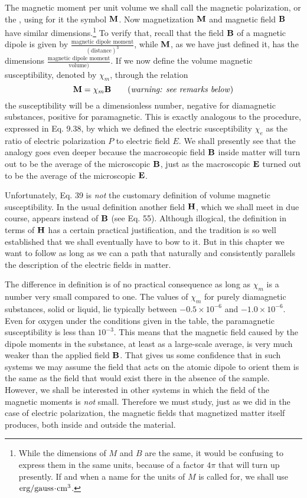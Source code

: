 The magnetic moment per unit volume we shall call the magnetic
polarization, or the , using for it the symbol $\mathbf{M}$. Now
magnetization $\mathbf{M}$ and magnetic field $\mathbf{B}$ have 
similar dimensions.\footnote{While the dimensions of $M$ and $B$
are the same, it would be confusing to express
them in the same units, because of a factor $4\pi$ that will turn up presently. If and
when a name for the units of $M$ is called for, we shall use 
$\textup{erg}/\textup{gauss}\!\cdot\!\textup{cm}^3$.} To
verify that, recall that the field $\mathbf{B}$ of a magnetic dipole is given by
$\frac{\text{magnetic dipole moment}}{(\text{distance})^3}$, while $\mathbf{M}$, as we have
just defined it, has the dimensions
$\frac{\text{magnetic dipole moment}}{\text{volume})}$. If we now define the
volume magnetic susceptibility, denoted by $\chi_m$, through the relation
\begin{equation}
  \mathbf{M} = \chi_m\mathbf{B} \qquad (\text{\emph{warning: see remarks below}})
\end{equation}
the susceptibility will be a dimensionless number, negative for 
diamagnetic substances, positive for paramagnetic. This is exactly
analogous to the procedure, expressed in Eq. 9.38, by which we
defined the electric susceptibility $\chi_e$ as the ratio of electric polarization
$P$ to electric field $E$. We shall presently see that the analogy goes
even deeper because the macroscopic field $\mathbf{B}$ inside matter will turn
out to be the average of the microscopic $\mathbf{B}$, just as the macroscopic $\mathbf{E}$
turned out to be the average of the microscopic $\mathbf{E}$.


Unfortunately, Eq. 39 is \emph{not} the customary definition of volume
magnetic susceptibility. In the usual definition another field $\mathbf{H}$,
which we shall meet in due course, appears instead of $\mathbf{B}$ (see Eq. 55).
Although illogical, the definition in terms of $\mathbf{H}$ has a certain practical
justification, and the tradition is so well established that we shall
eventually have to bow to it. But in this chapter we want to follow
as long as we can a path that naturally and consistently parallels the
description of the electric fields in matter.

The difference in definition is of no practical consequence as long
as $\chi_m$ is a number very small compared to one. The values of $\chi_m$
for purely diamagnetic substances, solid or liquid, lie typically between
$-0.5\times10^{-6}$ and $-1.0\times10^{-6}$. Even for oxygen under the
conditions given in the table, the paramagnetic susceptibility is less
than $10^{-3}$. This means that the magnetic field caused by the dipole
moments in the substance, at least as a large-scale average, is very
much weaker than the applied field $\mathbf{B}$. That gives us some confidence
that in such systems we may assume the field that acts on the
atomic dipole to orient them is the same as the field that would exist
there in the absence of the sample. However, we shall be interested
in other systems in which the field of the magnetic moments is \emph{not}
small. Therefore we must study, just as we did in the case of electric
polarization, the magnetic fields that magnetized matter itself 
produces, both inside and outside the material.

